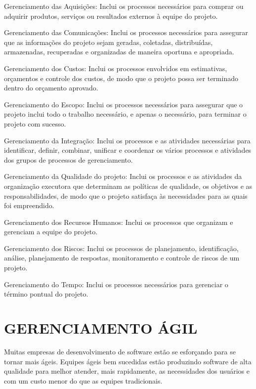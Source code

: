 Gerenciamento das Aquisições: Inclui os processos necessários para comprar ou adquirir produtos, serviços ou resultados externos à equipe do projeto. \cite{pmbok}

Gerenciamento das Comunicações: Inclui os processos necessários para assegurar que as informações do projeto sejam geradas, coletadas, distribuídas, armazenadas, recuperadas e organizadas de maneira oportuna e apropriada. \cite{pmbok}

Gerenciamento dos Custos: Inclui os processos envolvidos em estimativas, orçamentos e controle dos custos, de modo que o projeto possa ser terminado dentro do orçamento aprovado. \cite{pmbok}

Gerenciamento do Escopo: Inclui os processos necessários para assegurar que o projeto inclui todo o trabalho necessário, e apenas o necessário, para terminar o projeto com sucesso. \cite{pmbok}

Gerenciamento da Integração: Inclui os processos e as atividades necessárias para identificar, definir, combinar, unificar e coordenar os vários processos e atividades dos grupos de processos de gerenciamento. \cite{pmbok}

Gerenciamento da Qualidade do projeto: Inclui os processos e as atividades da organização executora que determinam as políticas de qualidade, os objetivos e as responsabilidades, de modo que o projeto satisfaça às necessidades para as quais foi empreendido. \cite{pmbok}

Gerenciamento dos Recursos Humanos: Inclui os processos que organizam e gerenciam a equipe do projeto. \cite{pmbok}

Gerenciamento dos Riscos: Inclui os processos de planejamento, identificação, análise, planejamento de respostas, monitoramento e controle de riscos de um projeto. \cite{pmbok}

Gerenciamento do Tempo: Inclui os processos necessários para gerenciar o término pontual do projeto. \cite{pmbok}

\section{GERENCIAMENTO ÁGIL}

Muitas empresas de desenvolvimento de software estão se esforçando para se tornar mais ágeis. Equipes ágeis bem sucedidas estão produzindo software de alta qualidade para melhor atender, mais rapidamente, as necessidades dos usuários e com um custo menor do que as equipes tradicionais. \cite{cohn2010}

